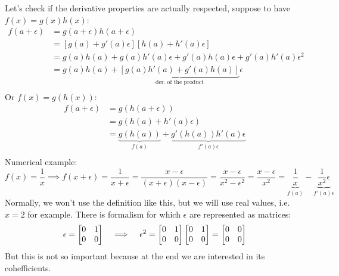 Let's check if the derivative properties are actually respected, suppose to have $f(x) = g(x)h(x)$:
\[
    \begin{split}
        f(a + \epsilon) &= g(a + \epsilon)h(a + \epsilon)\\
        &= [g(a) + g'(a)\epsilon][h(a) + h'(a)\epsilon]\\
        &= g(a)h(a) + g(a)h'(a)\epsilon + g'(a)h(a)\epsilon + g'(a)h'(a)\epsilon^2\\
        &= g(a)h(a) + \underbrace{[g(a)h'(a) + g'(a)h(a)]}_{\text{der. of the product}}\epsilon\\
    \end{split}
\]
Or $f(x) = g(h(x))$:
\[
    \begin{split}
        f(a + \epsilon) &= g(h(a + \epsilon))\\
        &= g(h(a) + h'(a)\epsilon)\\
        &= \underbrace{ g(h(a))}_{f(a)} + \underbrace{g'(h(a))h'(a)\epsilon}_{f'(a)\epsilon}\\        
    \end{split}
\]
Numerical example:  
\[
    f(x) = \dfrac{1}{x} \implies f(x+ \epsilon) = \dfrac{1}{x + \epsilon} = \dfrac{x -\epsilon}{(x + \epsilon)(x - \epsilon)} = \dfrac{x - \epsilon}{x^2 - \epsilon^2} = \dfrac{x - \epsilon}{x^2} = \underbrace{\dfrac{1}{x}}_{f(a)} - \underbrace{\dfrac{1}{x^2}\epsilon}_{f'(a)\epsilon}    
\]
Normally, we won't use the definition like this, but we will use real values, i.e. $x = 2$ for example. There is formalism for which $\epsilon$ are represented as matrices:
\[
    \epsilon = \begin{bmatrix}
        0 & 1\\
        0 & 0
    \end{bmatrix}
    \hspace{0.3cm} \implies \hspace{0.3cm}
    \epsilon^2 = \begin{bmatrix}
        0 & 1\\
        0 & 0
    \end{bmatrix}
    \begin{bmatrix}
        0 & 1\\
        0 & 0
    \end{bmatrix}
    = \begin{bmatrix}
        0 & 0\\
        0 & 0
    \end{bmatrix}    
\]
But this is not so important because at the end we are interested in its cohefficients. 

